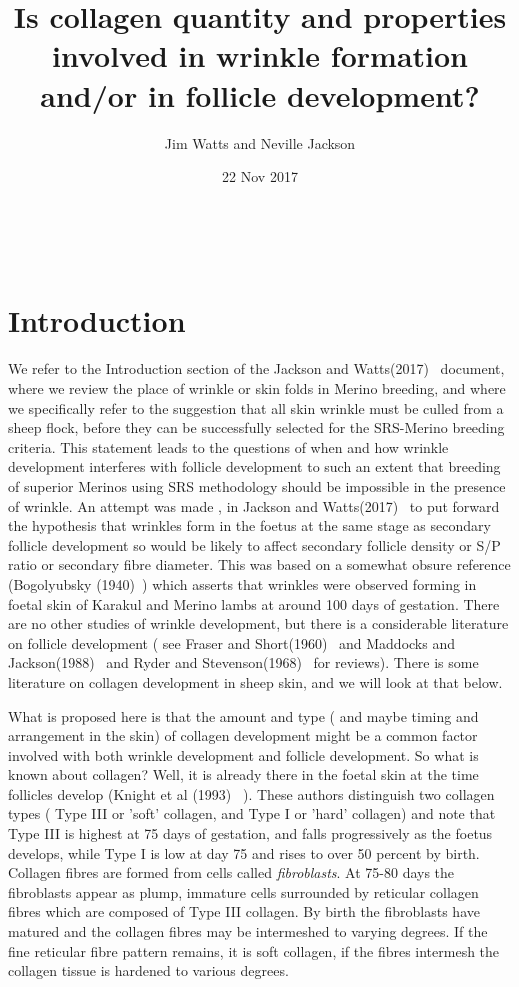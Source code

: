 \documentclass[titlepage]{article}  %
\title{Is collagen quantity and properties involved in wrinkle formation and/or in follicle development?}
\author{Jim Watts and Neville Jackson}
\date{22 Nov 2017}
\begin{document}
 


 
\maketitle      
\tableofcontents

$\newcommand{\E}{\mathrm{E}}$
$\newcommand{\Var}{\mathrm{Var}}$
$\newcommand{\Cov}{\mathrm{Cov}}$ 
$\newcommand{\SD}{\mathrm{SD}}$ 

\clearpage
\section{Introduction} 
We refer to the Introduction section of the Jackson and Watts(2017)~\cite{jack:17b} document, where we review the place of wrinkle or skin folds in Merino breeding, and where we specifically refer to the suggestion that all skin wrinkle must be culled from a sheep flock, before they can be successfully selected for the SRS-Merino breeding criteria. This statement leads to the questions of when and how wrinkle development interferes with follicle development to such an extent that breeding of superior Merinos using SRS methodology should be impossible in the presence of wrinkle. An attempt was made , in Jackson and Watts(2017)~\cite{jack:17b} to put forward the hypothesis that wrinkles form in the foetus at the same stage as secondary follicle development so would be likely to affect secondary follicle density or S/P ratio or secondary fibre diameter. This was based on a somewhat obsure reference (Bogolyubsky (1940)~\cite{bogo:40}) which asserts that wrinkles were observed forming in foetal skin of Karakul and Merino lambs at around 100 days of gestation. There are no other studies of wrinkle development, but there is a considerable literature on follicle development ( see Fraser and Short(1960)~\cite{fras:60} and Maddocks and Jackson(1988)~\cite{madd:88} and Ryder and Stevenson(1968)~\cite{ryde:68} for reviews). There is some literature on collagen development in sheep skin, and we will look at that below.

What is proposed here is that the amount and type ( and maybe timing and arrangement in the skin) of collagen development might be a common factor involved with both wrinkle development and follicle development. So what is known about collagen? Well, it is already there in the foetal skin at the time follicles develop (Knight et al (1993) ~\cite{knig:93}).  These authors distinguish two collagen types ( Type III or 'soft' collagen, and Type I or 'hard' collagen) and note  that Type III is highest at 75 days of gestation, and falls progressively as the foetus develops, while Type I is low at day 75 and rises to over 50 percent by birth. Collagen fibres are formed from cells called {\em fibroblasts}. At 75-80 days the fibroblasts appear as plump, immature cells surrounded by reticular collagen fibres which are composed of Type III collagen. By birth the fibroblasts have matured  and the collagen fibres may be intermeshed to varying degrees. If the fine reticular fibre pattern remains, it is soft collagen, if the fibres intermesh the collagen tissue is hardened to various degrees. 
\end{document}
